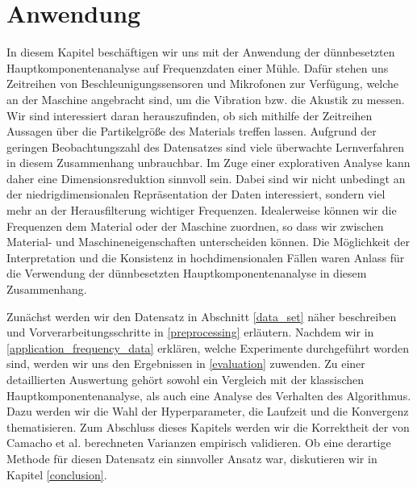 \chapter{Anwendung}

\label{application}

In diesem Kapitel beschäftigen wir uns mit der Anwendung der dünnbesetzten Hauptkomponentenanalyse auf Frequenzdaten einer Mühle. Dafür stehen uns Zeitreihen von Beschleunigungssensoren und Mikrofonen zur Verfügung, welche an der Maschine angebracht sind, um die Vibration bzw. die Akustik zu messen. Wir sind interessiert daran herauszufinden, ob sich mithilfe der Zeitreihen Aussagen über die Partikelgröße des Materials treffen lassen. Aufgrund der geringen Beobachtungszahl des Datensatzes sind viele überwachte Lernverfahren in diesem Zusammenhang unbrauchbar. Im Zuge einer explorativen Analyse kann daher eine Dimensionsreduktion sinnvoll sein. Dabei sind wir nicht unbedingt an der niedrigdimensionalen Repräsentation der Daten interessiert, sondern viel mehr an der Herausfilterung wichtiger Frequenzen. Idealerweise können wir die Frequenzen dem Material oder der Maschine zuordnen, so dass wir zwischen Material- und Maschineneigenschaften unterscheiden können. Die Möglichkeit der Interpretation und die Konsistenz in hochdimensionalen Fällen waren Anlass für die Verwendung der dünnbesetzten Hauptkomponentenanalyse in diesem Zusammenhang. 

Zunächst werden wir den Datensatz in Abschnitt \ref{data_set} näher beschreiben und Vorverarbeitungsschritte in \ref{preprocessing} erläutern. Nachdem wir in \ref{application_frequency_data} erklären, welche Experimente durchgeführt worden sind, werden wir uns den Ergebnissen in \ref{evaluation} zuwenden. Zu einer detaillierten Auswertung gehört sowohl ein Vergleich mit der klassischen Hauptkomponentenanalyse, als auch eine Analyse des Verhalten des Algorithmus. Dazu werden wir die Wahl der Hyperparameter, die Laufzeit und die Konvergenz thematisieren. Zum Abschluss dieses Kapitels werden wir die Korrektheit der von Camacho et al. \cite{camacho} berechneten Varianzen empirisch validieren. Ob eine derartige Methode für diesen Datensatz ein sinnvoller Ansatz war, diskutieren wir in Kapitel \ref{conclusion}.




